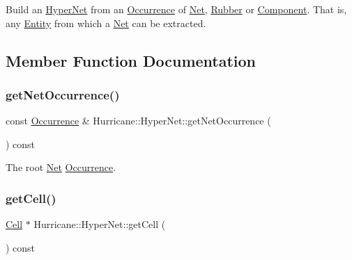 Build an \mbox{\hyperlink{classHurricane_1_1HyperNet}{Hyper\+Net}} from an \mbox{\hyperlink{classHurricane_1_1Occurrence}{Occurrence}} of \mbox{\hyperlink{classHurricane_1_1Net}{Net}}, \mbox{\hyperlink{classHurricane_1_1Rubber}{Rubber}} or \mbox{\hyperlink{classHurricane_1_1Component}{Component}}. That is, any \mbox{\hyperlink{classHurricane_1_1Entity}{Entity}} from which a \mbox{\hyperlink{classHurricane_1_1Net}{Net}} can be extracted. 

\subsection{Member Function Documentation}
\mbox{\label{classHurricane_1_1HyperNet_a327eab6dda243836becde745bfc53efa}} 
\subsubsection{\texorpdfstring{get\+Net\+Occurrence()}{getNetOccurrence()}}
{\footnotesize\ttfamily const \mbox{\hyperlink{classHurricane_1_1Occurrence}{Occurrence}} \& Hurricane\+::\+Hyper\+Net\+::get\+Net\+Occurrence (\begin{DoxyParamCaption}{ }\end{DoxyParamCaption}) const\hspace{0.3cm}{\ttfamily [inline]}}

The root \mbox{\hyperlink{classHurricane_1_1Net}{Net}} \mbox{\hyperlink{classHurricane_1_1Occurrence}{Occurrence}}. \mbox{\label{classHurricane_1_1HyperNet_a5a818c5887d1d8dd2e0a59e8a57c02d7}} 
\subsubsection{\texorpdfstring{get\+Cell()}{getCell()}}
{\footnotesize\ttfamily \mbox{\hyperlink{classHurricane_1_1Cell}{Cell}} $\ast$ Hurricane\+::\+Hyper\+Net\+::get\+Cell (\begin{DoxyParamCaption}{ }\end{DoxyParamCaption}) const\hspace{0.3cm}{\ttfamily [inline]}}

